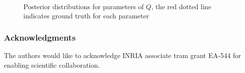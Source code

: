 \documentclass{article}
\begin{document}
\begin{figure}[h]
  \centering
  \mbox{
    \quad
  }
  \caption{Posterior distributions for parameters of $Q$, the red dotted line indicates ground truth for each parameter}
  \label{fig:postQ2}
\end{figure}





\subsubsection*{Acknowledgments}

The authors would like to acknowledge INRIA associate tram grant EA-544 for enabling scientific collaboration.

\medskip

\small


\end{document}
